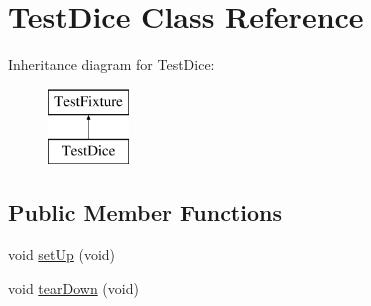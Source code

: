 \hypertarget{class_test_dice}{}\section{Test\+Dice Class Reference}
\label{class_test_dice}
Inheritance diagram for Test\+Dice\+:\begin{figure}[H]
\begin{center}
\leavevmode
\includegraphics[height=2.000000cm]{class_test_dice}
\end{center}
\end{figure}
\subsection*{Public Member Functions}
\begin{DoxyCompactItemize}
\item 
void \hyperlink{class_test_dice_ab667ce059357171f1d8518c052e50f64}{set\+Up} (void)
\item 
void \hyperlink{class_test_dice_af92d20c1d04e258061ebba44ac109d43}{tear\+Down} (void)
\end{DoxyCompactItemize}
